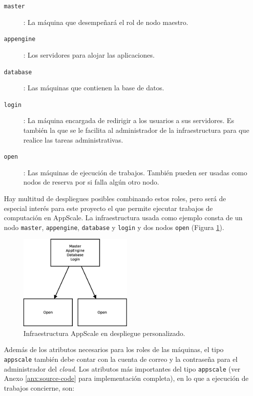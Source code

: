 \begin{description}
\item[\texttt{master}]: La máquina que desempeñará el rol de nodo maestro.
\item[\texttt{appengine}]: Los servidores para alojar las aplicaciones.
\item[\texttt{database}]: Las máquinas que contienen la base de datos.
\item[\texttt{login}]: La máquina encargada de redirigir a los usuarios a sus servidores. Es también la que se le facilita al administrador de la infraestructura para que realice las tareas administrativas.
\item[\texttt{open}]: Las máquinas de ejecución de trabajos. También pueden ser usadas como nodos de reserva por si falla algún otro nodo.
\end{description}

Hay multitud de despliegues posibles combinando estos roles, pero será de especial interés para este proyecto el que permite ejecutar trabajos de computación en AppScale. La infraestructura usada como ejemplo consta de un nodo \texttt{master}, \texttt{appengine}, \texttt{database} y \texttt{login} y dos nodos \texttt{open} (Figura \ref{figure:arquitectura-appscale}).

\begin{figure} [!htbp]
  \centering
  \includegraphics[width=0.5\textwidth]{figuras/Arquitectura_AppScale.eps}
  \caption{Infraestructura AppScale en despliegue personalizado.}
\label{figure:arquitectura-appscale}
\end{figure}

Además de los atributos necesarios para los roles de las máquinas, el tipo \texttt{appscale} también debe contar con la cuenta de correo y la contraseña para el administrador del \emph{cloud}. Los atributos más importantes del tipo \texttt{appscale} (ver Anexo \ref{anx:source-code} para implementación completa), en lo que a ejecución de trabajos concierne, son:

